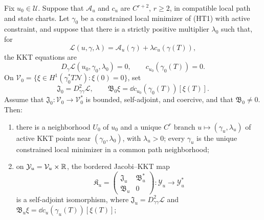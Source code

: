 \begin{theorem}
\label{thm:hard-target-jacobi}
Fix \(u_0\in\mathcal U\).  Suppose that \(\mathcal A_u\) and \(c_u\) are
\(C^{r+2}\), \(r\ge2\), in compatible local path and state charts.  Let
\(\gamma_0\) be a constrained local minimizer of \textup{(HT1)} with active
constraint, and suppose that there is a strictly positive multiplier
\(\lambda_0\) such that, for
\[
  \mathscr L(u,\gamma,\lambda)
  =\mathcal A_u(\gamma)+\lambda c_u(\gamma(T)),
\]
the KKT equations are
\begin{equation}
  D_\gamma\mathscr L(u_0,\gamma_0,\lambda_0)=0,
  \qquad c_{u_0}(\gamma_0(T))=0.
  \tag{HT2}
\end{equation}
On
\(\mathcal V_0=\{\xi\in H^1(\gamma_0^*T\mathcal N):\xi(0)=0\}\), set
\[
  \mathfrak J_0=D_{\gamma\gamma}^2\mathscr L,
  \qquad
  \mathfrak B_0\xi
  =\dd c_{u_0}(\gamma_0(T))[\xi(T)].
\]
Assume that \(\mathfrak J_0:\mathcal V_0\to\mathcal V_0^*\) is bounded,
self-adjoint, and coercive, and that \(\mathfrak B_0\ne0\).  Then:
\begin{enumerate}[leftmargin=*,itemsep=0.3em]
  \item there is a neighborhood \(U_0\) of \(u_0\) and a unique \(C^r\)
  branch \(u\mapsto(\gamma_u,\lambda_u)\) of active KKT points near
  \((\gamma_0,\lambda_0)\), with \(\lambda_u>0\); every \(\gamma_u\) is the
  unique constrained local minimizer in a common path neighborhood;

  \item on \(\mathcal Y_u=\mathcal V_u\times\mathbb R\), the bordered Jacobi--KKT
  map
  \begin{equation}
    \mathfrak K_u
    =
    \begin{pmatrix}
      \mathfrak J_u&\mathfrak B_u^*\\
      \mathfrak B_u&0
    \end{pmatrix}
    :\mathcal Y_u\longrightarrow\mathcal Y_u^*
    \tag{HT3}
  \end{equation}
  is a self-adjoint isomorphism, where
  \(\mathfrak J_u=D_{\gamma\gamma}^2\mathscr L\) and
  \(\mathfrak B_u\xi=\dd c_u(\gamma_u(T))[\xi(T)]\);


\end{enumerate}
\end{theorem}
